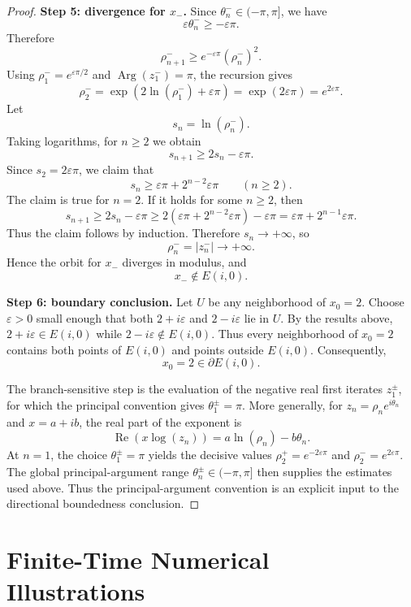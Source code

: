 \documentclass[12pt,a4paper]{amsart}
\theoremstyle{remark}
\begin{document}
\begin{proof}
\smallskip
\noindent\textbf{Step 5: divergence for $x_-$.}
Since $\theta_n^-\in(-\pi,\pi]$, we have
\[
\varepsilon\theta_n^-\ge -\varepsilon\pi.
\]
Therefore
\[
\rho_{n+1}^-
\ge
e^{-\varepsilon\pi}(\rho_n^-)^2.
\]
Using $\rho_1^-=e^{\varepsilon\pi/2}$ and $\operatorname{Arg}(z_1^-)=\pi$, the recursion
gives
\[
\rho_2^-
=\exp(2\ln(\rho_1^-)+\varepsilon\pi)
=\exp(2\varepsilon\pi)
=e^{2\varepsilon\pi}.
\]
Let
\[
s_n=\ln(\rho_n^-).
\]
Taking logarithms, for $n\ge 2$ we obtain
\[
s_{n+1}\ge 2s_n-\varepsilon\pi.
\]
Since $s_2=2\varepsilon\pi$, we claim that
\[
s_n\ge \varepsilon\pi+2^{n-2}\varepsilon\pi
\qquad(n\ge 2).
\]
The claim is true for $n=2$. If it holds for some $n\ge 2$, then
\[
s_{n+1}
\ge 2s_n-\varepsilon\pi
\ge 2(\varepsilon\pi+2^{n-2}\varepsilon\pi)-\varepsilon\pi
=\varepsilon\pi+2^{n-1}\varepsilon\pi.
\]
Thus the claim follows by induction. Therefore $s_n\to+\infty$, so
\[
\rho_n^-=|z_n^-|\to+\infty.
\]
Hence the orbit for $x_-$ diverges in modulus, and
\[
x_-\notin E(i,0).
\]

\smallskip
\noindent\textbf{Step 6: boundary conclusion.}
Let $U$ be any neighborhood of $x_0=2$. Choose $\varepsilon>0$ small enough
that both $2+i\varepsilon$ and $2-i\varepsilon$ lie in $U$. By the results
above, $2+i\varepsilon\in E(i,0)$ while $2-i\varepsilon\notin E(i,0)$.
Thus every neighborhood of $x_0=2$ contains both points of $E(i,0)$ and points
outside $E(i,0)$. Consequently,
\[
x_0=2\in\partial E(i,0).
\]

The branch-sensitive step is the evaluation of the negative real first
iterates $z_1^\pm$, for which the principal convention gives
$\theta_1^\pm=\pi$. More generally, for
$z_n=\rho_n e^{i\theta_n}$ and $x=a+ib$, the real part of the exponent is
\[
\operatorname{Re}(x\log(z_n))
=a\ln(\rho_n)-b\theta_n.
\]
At $n=1$, the choice $\theta_1^\pm=\pi$ yields the decisive values
$\rho_2^+=e^{-2\varepsilon\pi}$ and
$\rho_2^-=e^{2\varepsilon\pi}$. The global principal-argument range
$\theta_n^\pm\in(-\pi,\pi]$ then supplies the estimates used above. Thus the
principal-argument convention is an explicit input to the directional
boundedness conclusion.
\end{proof}



\medskip

\section{Finite-Time Numerical Illustrations}
\label{sec:numerical-observations}
\end{document}
